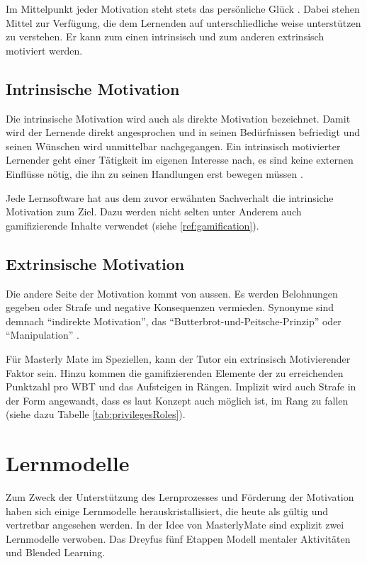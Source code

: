 Im Mittelpunkt jeder Motivation steht stets das persönliche Glück
\cite{stampfl:2012}. Dabei stehen Mittel zur Verfügung, die dem Lernenden auf
unterschliedliche weise unterstützen zu verstehen. Er kann zum einen
intrinsisch und zum anderen extrinsisch motiviert werden.

\subsection{Intrinsische Motivation}\label{ref:intrinsischeMotivation}
Die intrinsische Motivation wird auch als direkte Motivation bezeichnet. Damit
wird der Lernende direkt angesprochen und in seinen Bedürfnissen befriedigt und
seinen Wünschen wird unmittelbar nachgegangen. Ein intrinsisch motivierter
Lernender geht einer Tätigkeit im eigenen Interesse nach, es sind keine externen
Einflüsse nötig, die ihn zu seinen Handlungen erst bewegen müssen
\cite{jacobs:2010}.

Jede Lernsoftware hat aus dem zuvor erwähnten Sachverhalt die intrinsiche
Motivation zum Ziel. Dazu werden nicht selten unter Anderem auch gamifizierende
Inhalte verwendet (siehe \ref{ref:gamification}).

\subsection{Extrinsische Motivation}
Die andere Seite der Motivation kommt von aussen. Es werden Belohnungen gegeben
oder Strafe und negative Konsequenzen vermieden. Synonyme sind demnach
"`indirekte Motivation"', das "`Butterbrot-und-Peitsche-Prinzip"' oder
"`Manipulation"' \cite{jacobs:2010}.

Für Masterly Mate im Speziellen, kann der Tutor ein extrinsisch Motivierender
Faktor sein. Hinzu kommen die gamifizierenden Elemente der zu erreichenden
Punktzahl pro WBT und das Aufsteigen in Rängen. Implizit wird auch Strafe in der
Form angewandt, dass es laut Konzept auch möglich ist, im Rang zu fallen
(siehe dazu Tabelle \ref{tab:privilegesRoles}).

\section{Lernmodelle}
Zum Zweck der Unterstützung des Lernprozesses und Förderung der Motivation haben
sich einige Lernmodelle herauskristallisiert, die heute als gültig und
vertretbar angesehen werden. In der Idee von MasterlyMate sind explizit zwei
Lernmodelle verwoben. Das Dreyfus fünf Etappen Modell mentaler Aktivitäten und
Blended Learning.

